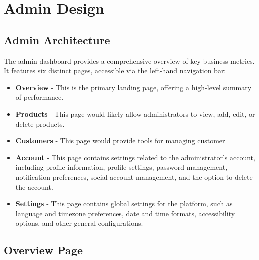 \documentclass[11pt,a4paper]{article}
\begin{document}
	
	\section{Admin Design}\label{sec:admin-design}
	\vspace{0.3cm}
	
	
	\subsection{Admin Architecture}\label{subsec:admin-architecture}
	The admin dashboard provides a comprehensive overview of key business metrics. It features six distinct pages, accessible via the left-hand navigation bar:
	\begin{itemize}
		\item \textbf{Overview} - This is the primary landing page, offering a high-level summary of performance.
		\item \textbf{Products} - This page would likely allow administrators to view, add, edit, or delete products.
		\item \textbf{Customers} - This page would provide tools for managing customer
		\item \textbf{Account} - This page contains settings related to the administrator's account, including profile information, profile settings, password management, notification preferences, social account management, and the option to delete the account.
		\item \textbf{Settings} - This page contains global settings for the platform, such as language and timezone preferences, date and time formats, accessibility options, and other general configurations.
	\end{itemize}
	\subsection{Overview Page}\label{subsec:overview-page}
	
\end{document}
